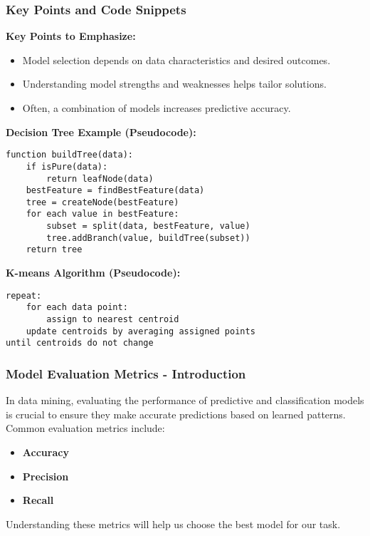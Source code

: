 \documentclass[aspectratio=169]{beamer}
\begin{document}
\begin{frame}[fragile]
    \frametitle{Key Points and Code Snippets}
    \textbf{Key Points to Emphasize:}
    \begin{itemize}
        \item Model selection depends on data characteristics and desired outcomes.
        \item Understanding model strengths and weaknesses helps tailor solutions.
        \item Often, a combination of models increases predictive accuracy.
    \end{itemize}

    \textbf{Decision Tree Example (Pseudocode):}
    \begin{lstlisting}
function buildTree(data):
    if isPure(data):
        return leafNode(data)
    bestFeature = findBestFeature(data)
    tree = createNode(bestFeature)
    for each value in bestFeature:
        subset = split(data, bestFeature, value)
        tree.addBranch(value, buildTree(subset))
    return tree
    \end{lstlisting}

    \textbf{K-means Algorithm (Pseudocode):}
    \begin{lstlisting}
repeat:
    for each data point:
        assign to nearest centroid
    update centroids by averaging assigned points
until centroids do not change
    \end{lstlisting}
\end{frame}

\begin{frame}[fragile]
    \frametitle{Model Evaluation Metrics - Introduction}
    In data mining, evaluating the performance of predictive and classification models is crucial to ensure they make accurate predictions based on learned patterns. Common evaluation metrics include:
    \begin{itemize}
        \item \textbf{Accuracy}
        \item \textbf{Precision}
        \item \textbf{Recall}
    \end{itemize}
    Understanding these metrics will help us choose the best model for our task.
\end{frame}
\end{document}

